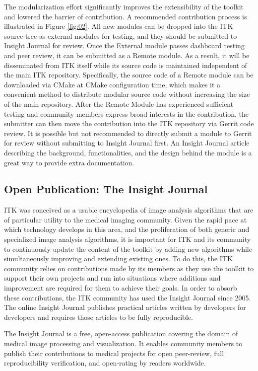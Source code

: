 \documentclass{frontiersENG} %
\begin{document}
The modularization effort significantly improves the extensibility of the
toolkit and lowered the barrier of contribution. A recommended contribution
process is illustrated in Figure \ref{fig:02}.  All new modules can be dropped
into the ITK source tree as external modules for testing, and they should be
submitted to Insight Journal for review. Once the External module passes
dashboard testing and peer review, it can be submitted as a Remote module. As
a result, it will be disseminated from ITK itself while its source code is
maintained independent of the main ITK repository. Specifically, the source
code of a Remote module can be downloaded via CMake at CMake configuration
time, which makes it a convenient method to distribute modular source code
without increasing the size of the main repository. After the Remote Module
has experienced sufficient testing and community members express broad
interests in the contribution, the submitter can then move the contribution
into the ITK repository via Gerrit code review.  It is possible but not
recommended to directly submit a module to Gerrit for review without
submitting to Insight Journal first. An Insight Journal article describing the
background, functionalities, and the design behind the module is a great way
to provide extra documentation.


\subsection{Open Publication: The Insight Journal}
ITK was conceived as a usable encyclopedia of image analysis algorithms
that are of particular utility to the medical imaging community. Given the
rapid pace at which technology develops in this area, and the proliferation of
both generic and specialized image analysis algorithms, it is important for ITK
and its community to continuously update the content of the toolkit by adding
new algorithms while simultaneously improving and extending existing ones. To
do this, the ITK community relies on contributions made by its members as they
use the toolkit to support their own projects and run into situations where
additions and improvement are required for them to achieve their goals. In
order to absorb these contributions, the ITK community has used the Insight
Journal \cite{InsightJournal} since 2005. The online Insight Journal
publishes practical articles written by developers for developers and requires
those articles to be fully reproducible.

The Insight Journal is a free, open-access publication covering the domain of
medical image processing and visualization. It enables community members to
publish their contributions to medical projects for open peer-review, full
reproducibility verification, and open-rating by readers worldwide.
\end{document}
